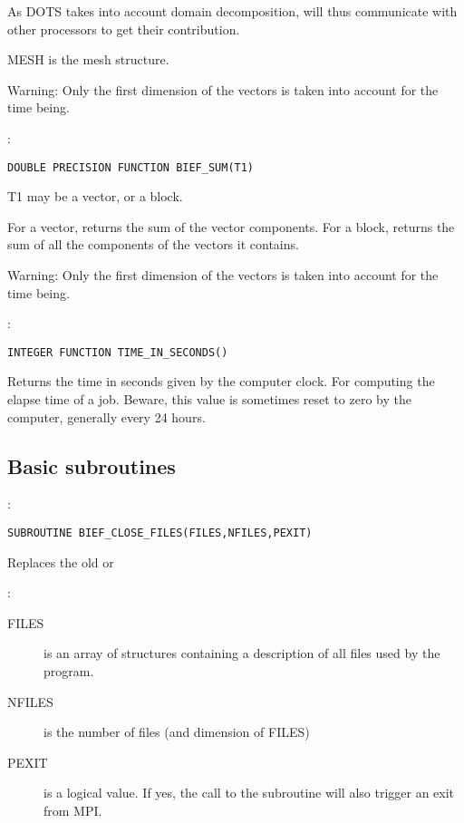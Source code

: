 As DOTS takes into account domain decomposition,  will thus
communicate with other processors to get their contribution.

MESH is the mesh structure.

\begin{WarningBlock}{Warning:}
Only the first dimension of the vectors is taken into account for the time being.
\end{WarningBlock}

:
\begin{lstlisting}[language=TelFortran]
DOUBLE PRECISION FUNCTION BIEF_SUM(T1)
\end{lstlisting}

T1 may be a vector, or a block.

For a vector, returns the sum of the vector components. For a block, returns
the sum of all the components of the vectors it contains.

\begin{WarningBlock}{Warning:}
Only the first dimension of the vectors is taken into account for the time being.
\end{WarningBlock}

:
\begin{lstlisting}[language=TelFortran]
INTEGER FUNCTION TIME_IN_SECONDS()
\end{lstlisting}

Returns the time in seconds given by the computer clock. For computing the
elapse time of a job. Beware, this value is sometimes reset to zero by the
computer, generally every 24 hours.

\subsection{Basic subroutines}

:
\begin{lstlisting}[language=TelFortran]
SUBROUTINE BIEF_CLOSE_FILES(FILES,NFILES,PEXIT)
\end{lstlisting}

Replaces the old  or 

:
\begin{description}
  \item [FILES] is an array of  structures containing a
    description of all files used by the program.
  \item [NFILES] is the number of files (and dimension of FILES)
  \item [PEXIT] is a logical value. If yes, the call to the subroutine will
    also trigger an exit from MPI.
\end{description}


